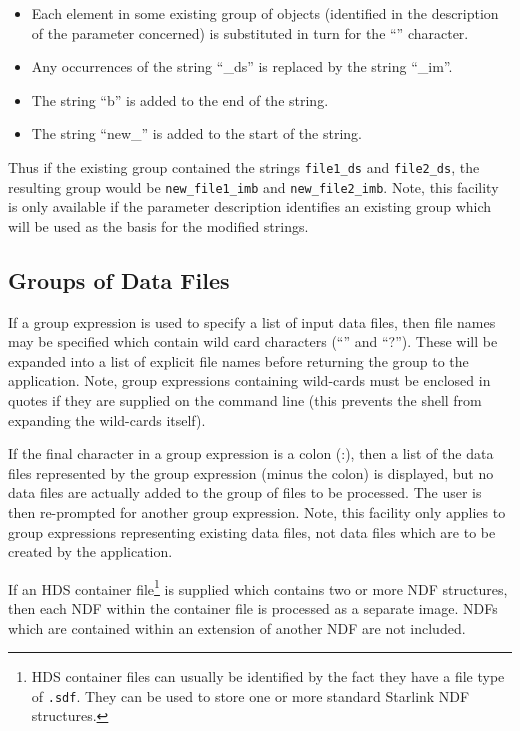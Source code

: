 \documentclass[twoside,11pt]{starlink}
\providecommand{\lsk}{\raisebox{-0.4ex}{\rm *}}
\begin{document}
\begin{itemize}
\item   Each element in some existing group of objects (identified in
     the description of the parameter concerned) is substituted
     in turn for the ``\lsk'' character.
\item  Any occurrences of the string ``\_ds'' is replaced by the string
     ``\_im''.
\item  The string ``b'' is added to the end of the string.
\item  The string ``new\_'' is added to the start of the string.
\end{itemize}

Thus if the existing group contained the strings \verb+file1_ds+ and
\verb+file2_ds+, the resulting group would be \verb+new_file1_imb+
and \verb+new_file2_imb+. Note, this facility is only available if
the parameter description identifies an existing group which will be used
as the basis for the modified strings.

\subsection{Groups of Data Files}
\label{SEC:NDF}
If a group expression is used to specify a list of input data files,
then file names may be specified which contain wild card characters
(``\lsk'' and ``?''). These  will be expanded into a list of explicit
file names before returning the group to the application. Note,
group expressions containing wild-cards must be enclosed
in quotes if they are supplied on the command line (this prevents the shell
from expanding the wild-cards itself).

If the final character in a group expression is a colon (:), then a list
of the data files represented by the group expression (minus the colon)
is displayed, but no data files are actually added to the group of files
to be processed. The user is then re-prompted for another group
expression. Note, this facility only applies to group expressions
representing existing data files, not data files which are to be created
by the application.

If an HDS container file\footnote{HDS container files can usually be
identified by the fact they have a file type of \texttt{.sdf}. They can be
used to store one or more standard Starlink NDF structures.} is supplied
which contains two or more NDF structures, then each NDF within the
container file is processed as a separate image. NDFs which are contained
within an extension of another NDF are not included.
\end{document}
